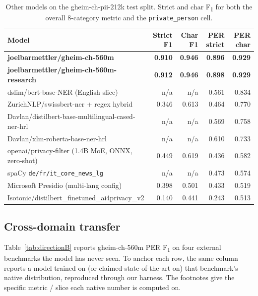 \documentclass[sigconf,nonacm]{acmart}
\begin{document}
\begin{table}[!htbp]
\centering
\caption{Other models on the \textsf{gheim-ch-pii-212k} test split.
Strict and char F\textsubscript{1} for both the overall 8-category
metric and the \texttt{private\_person} cell.}
\label{tab:directionA}
\small
\begin{tabular}{l r r r r}
\toprule
Model                                                            & Strict F1 & Char F1 & PER strict & PER char \\
\midrule
\textbf{\textsf{joelbarmettler/gheim-ch-560m}}                  & \textbf{0.910} & \textbf{0.946} & \textbf{0.896} & \textbf{0.929} \\
\textbf{\textsf{joelbarmettler/gheim-ch-560m-research}}          & \textbf{0.912} & \textbf{0.946} & \textbf{0.898} & \textbf{0.929} \\
\textsf{dslim/bert-base-NER} (English slice)                     & n/a   & n/a   & 0.561 & 0.834 \\
\textsf{ZurichNLP/swissbert-ner} + regex hybrid                  & 0.346 & 0.613 & 0.464 & 0.770 \\
\textsf{Davlan/distilbert-base-multilingual-cased-ner-hrl}       & n/a   & n/a   & 0.569 & 0.758 \\
\textsf{Davlan/xlm-roberta-base-ner-hrl}                         & n/a   & n/a   & 0.610 & 0.733 \\
\textsf{openai/privacy-filter} (1.4B MoE, ONNX, zero-shot)       & 0.449 & 0.619 & 0.436 & 0.582 \\
spaCy \texttt{de/fr/it\_core\_news\_lg}                          & n/a   & n/a   & 0.473 & 0.574 \\
Microsoft Presidio (multi-lang config)                           & 0.398 & 0.501 & 0.433 & 0.519 \\
\textsf{Isotonic/distilbert\_finetuned\_ai4privacy\_v2}          & 0.140 & 0.441 & 0.243 & 0.513 \\
\bottomrule
\end{tabular}
\end{table}

\subsection{Cross-domain transfer}
\label{app:directionB}

Table~\ref{tab:directionB} reports \textsf{gheim-ch-560m} PER
F\textsubscript{1} on four external benchmarks the model has never
seen. To anchor each row, the same column reports a model trained
on (or claimed-state-of-the-art on) that benchmark's native
distribution, reproduced through our harness. The footnotes give
the specific metric / slice each native number is computed on.
\end{document}
